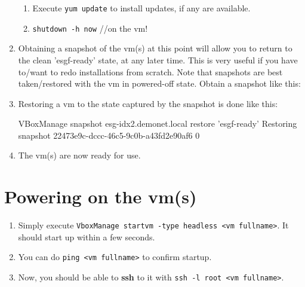 \begin{enumerate}
\begin{enumerate}
\item Execute  \texttt{yum update} to install updates, if any are available. 
\item \texttt{shutdown -h now} //on the vm!
\end{enumerate}
\item Obtaining a snapshot of the vm(s) at this point will allow you to return to the clean 'esgf-ready' state, at any later time. This is very useful if you have to/want to redo installations from scratch. Note that snapshots are best taken/restored with the vm in powered-off state. Obtain a snapshot like this:
\begin{small}
\end{small}
\item Restoring a vm to the state captured by the snapshot is done like this:
\begin{small}
\begin{verbatimtab}[4]
VBoxManage snapshot esg-idx2.demonet.local restore 'esgf-ready'
Restoring snapshot 22473e9c-dccc-46c5-9c0b-a43fd2e90af6
0%
\end{verbatimtab}
\end{small}
\item The vm(s) are now ready for use.
\end{enumerate}
\section{Powering on the vm(s)}
\label{powon}
\begin{enumerate}
\item Simply execute \texttt{VboxManage startvm -type headless <vm fullname>}. It should start up within a few seconds. 
\item You can do \texttt{ping <vm fullname>} to confirm startup. 
\item Now, you should be able to \textbf{ssh} to it with \texttt{ssh -l root <vm fullname>}.
\end{enumerate}
